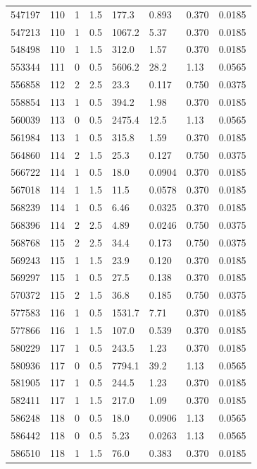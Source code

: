 \documentclass[preview]{standalone}
\begin{document}
{{{{{{{\begin{tabular}{L{1.2cm}C{1.2cm} C{0.3cm}C{0.5cm} C{1.4cm}C{1.4cm} C{1.4cm}C{1.4cm}}
  547197  &   110  & 1     & 1.5 &  177.3  & 0.893  & 0.370 &  0.0185   \\ 
  547213  &   110  & 1     & 0.5 &  1067.2  & 5.37  & 0.370 &  0.0185   \\ 
  548498  &   110  & 1     & 1.5 &  312.0  & 1.57  & 0.370 &  0.0185   \\ 
  553344  &   111  & 0     & 0.5 &  5606.2  & 28.2  & 1.13 &  0.0565   \\ 
  556858  &   112  & 2     & 2.5 &  23.3  & 0.117  & 0.750 &  0.0375   \\ 
  558854  &   113  & 1     & 0.5 &  394.2  & 1.98  & 0.370 &  0.0185   \\ 
  560039  &   113  & 0     & 0.5 &  2475.4  & 12.5  & 1.13 &  0.0565   \\ 
  561984  &   113  & 1     & 0.5 &  315.8  & 1.59  & 0.370 &  0.0185   \\ 
  564860  &   114  & 2     & 1.5 &  25.3  & 0.127  & 0.750 &  0.0375   \\ 
  566722  &   114  & 1     & 0.5 &  18.0  & 0.0904  & 0.370 &  0.0185   \\ 
  567018  &   114  & 1     & 1.5 &  11.5  & 0.0578  & 0.370 &  0.0185   \\ 
  568239  &   114  & 1     & 0.5 &  6.46  & 0.0325  & 0.370 &  0.0185   \\ 
  568396  &   114  & 2     & 2.5 &  4.89  & 0.0246  & 0.750 &  0.0375   \\ 
  568768  &   115  & 2     & 2.5 &  34.4  & 0.173  & 0.750 &  0.0375   \\ 
  569243  &   115  & 1     & 1.5 &  23.9  & 0.120  & 0.370 &  0.0185   \\ 
  569297  &   115  & 1     & 0.5 &  27.5  & 0.138  & 0.370 &  0.0185   \\ 
  570372  &   115  & 2     & 1.5 &  36.8  & 0.185  & 0.750 &  0.0375   \\ 
  577583  &   116  & 1     & 0.5 &  1531.7  & 7.71  & 0.370 &  0.0185   \\ 
  577866  &   116  & 1     & 1.5 &  107.0  & 0.539  & 0.370 &  0.0185   \\ 
  580229  &   117  & 1     & 0.5 &  243.5  & 1.23  & 0.370 &  0.0185   \\ 
  580936  &   117  & 0     & 0.5 &  7794.1  & 39.2  & 1.13 &  0.0565   \\ 
  581905  &   117  & 1     & 0.5 &  244.5  & 1.23  & 0.370 &  0.0185   \\ 
  582411  &   117  & 1     & 1.5 &  217.0  & 1.09  & 0.370 &  0.0185   \\ 
  586248  &   118  & 0     & 0.5 &  18.0  & 0.0906  & 1.13 &  0.0565   \\ 
  586442  &   118  & 0     & 0.5 &  5.23  & 0.0263  & 1.13 &  0.0565   \\ 
  586510  &   118  & 1     & 1.5 &  76.0  & 0.383  & 0.370 &  0.0185   \\ 
\hline 
\end{tabular} 

}}}}}}}
\end{document}
